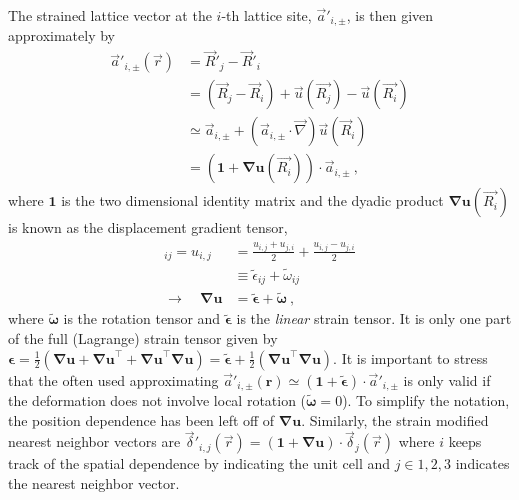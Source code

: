 The strained lattice vector at the $i$-th lattice site, $\vec{a}'_{i,\pm}$, is then given approximately by
\begin{align}
  \vec{a}'_{i,\pm}(\vec{r})&=\vec{R}'_j-\vec{R}'_i \nonumber\\
                              &=(\vec{R}_j-\vec{R}_i)+\vec{u}(\vec{R_j})-\vec{u}(\vec{R_i}) \nonumber \\
                              &\simeq\vec{a}_{i,\pm}+(\vec{a}_{i,\pm} \cdot \vec{\nabla}) \vec{u}(\vec{R}_i) \nonumber \\
                              &=\left(\bm{1}+\bm{\nabla u}(\vec{R_i}) \right)\cdot \vec{a}_{i,\pm} \label{eq:PVP:StrainVectors} \ ,
\end{align}
where $\bm{1}$ is the two dimensional identity matrix and the dyadic product $\bm{\nabla u}(\vec{R_i})$ is known as the displacement gradient tensor, 
\begin{align*}
  [\bm{\nabla u}]_{ij} = u_{i,j} &= \frac{u_{i,j}+u_{j,i}}{2} + \frac{u_{i,j}-u_{j,i}}{2} \\
                       &\equiv \tilde{\epsilon}_{ij} + \tilde{\omega}_{ij} \\
    \rightarrow \quad \bm{\nabla u} &= \tilde{\bm{\epsilon}} + \tilde{\bm{\omega}} \ ,
\end{align*}
where $\tilde{\bm{\omega}}$ is the rotation tensor and $\tilde{\bm{\epsilon}}$ is the \emph{linear} strain tensor. It is only one part of the full (Lagrange) strain tensor given by $\bm{\epsilon} = \tfrac{1}{2}(\bm{\nabla u} + \bm{\nabla u}^\top+\bm{\nabla u}^\top\bm{\nabla u}) = \tilde{\bm{\epsilon}} + \tfrac{1}{2}(\bm{\nabla u}^\top\bm{\nabla u})$.
It is important to stress that the often used approximating $\vec{a}'_{i,\pm}(\bm{r})\simeq (\bm{1}+\tilde{\bm{\epsilon}})\cdot \vec{a}'_{i,\pm}$ is only valid if the deformation does not involve local rotation ($\tilde{\bm{\omega}}=0$).
To simplify the notation, the position dependence has been left off of $\bm{\nabla u}$.
Similarly, the strain modified nearest neighbor vectors are $\vec{\delta}'_{i,j}(\vec{r})=(\bm{1}+\bm{\nabla u}) \cdot \vec{\delta}_{j}(\vec{r})$ \cite{Kitt2013} where $i$ keeps track of the spatial dependence by indicating the unit cell and $j \in {1,2,3}$ indicates the nearest neighbor vector.

